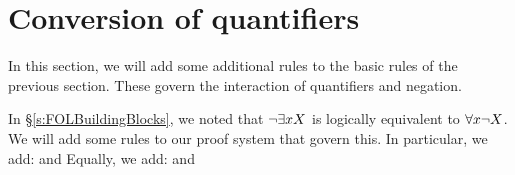 \chapter{Conversion of quantifiers}\label{s:CQ}

In this section, we will add some additional rules to the basic rules of the previous section. These govern the interaction of quantifiers and negation.

In \S\ref{s:FOLBuildingBlocks}, we noted that $\neg\exists xX$ is logically equivalent to $\forall x \neg X$. We will add some rules to our proof system that govern this. In particular, we add:
and
Equally, we add:
and

